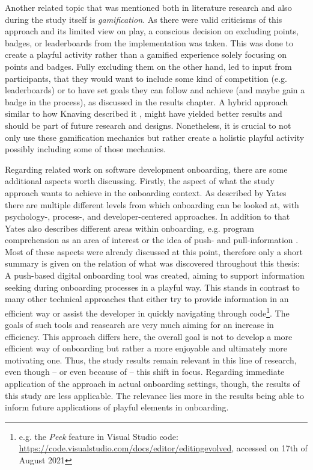 Another related topic that was mentioned both in literature research and also during the study itself is \textit{gamification}. As there were valid criticisms of this approach and its limited view on play, a conscious decision on excluding points, badges, or leaderboards from the implementation was taken. This was done to create a playful activity rather than a gamified experience solely focusing on points and badges. Fully excluding them on the other hand, led to input from participants, that they would want to include some kind of competition (e.g. leaderboards) or to have set goals they can follow and achieve (and maybe gain a badge in the process), as discussed in the results chapter. A hybrid approach similar to how Knaving described it \cite{knaving2013designing}, might have yielded better results and should be part of future research and designs. Nonetheless, it is crucial to not only use these gamification mechanics but rather create a holistic playful activity possibly including some of those mechanics.

Regarding related work on software development onboarding, there are some additional aspects worth discussing. Firstly, the aspect of what the study approach wants to achieve in the onboarding context. As described by Yates there are multiple different levels from which onboarding can be looked at, with psychology-, process-, and developer-centered approaches. In addition to that Yates also describes different areas within onboarding, e.g. program comprehension as an area of interest or the idea of push- and pull-information \cite{yates2014onboarding}. Most of these aspects were already discussed at this point, therefore only a short summary is given on the relation of what was discovered throughout this thesis: A push-based digital onboarding tool was created, aiming to support information seeking during onboarding processes in a playful way. This stands in contrast to many other technical approaches that either try to provide information in an efficient way \cite{dominic2020onboarding} or assist the developer in quickly navigating through code\footnote{e.g. the \textit{Peek} feature in Visual Studio code: \url{https://code.visualstudio.com/docs/editor/editingevolved}, accessed on 17th of August 2021}. The goals of such tools and reasearch are very much aiming for an increase in efficiency. This approach differs here, the overall goal is not to develop a more efficient way of onboarding but rather a more enjoyable and ultimately more motivating one. Thus, the study results remain relevant in this line of research, even though -- or even because of -- this shift in focus. Regarding immediate application of the approach in actual onboarding settings, though, the results of this study are less applicable. The relevance lies more in the results being able to inform future applications of playful elements in onboarding.
